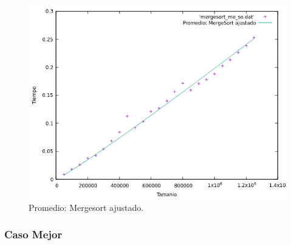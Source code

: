 \documentclass[a4paper,12pt,twoside]{article} %
\begin{document}
\begin{itemize}
\begin{figure}[h]
  \begin{center}
  
  	\includegraphics[scale=0.8]{mergesort_me_so_a.png}
  	\caption{Promedio: Mergesort ajustado.}
  	
  \end{center}
\end{figure}
		
	\end{itemize}
	\newpage
	
	
	\subsubsection{Caso Mejor}
	
\end{document}
